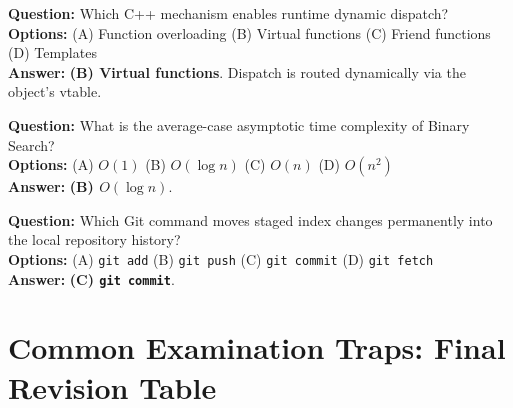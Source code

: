 \begin{tcolorbox}[colback=white,colframe=primary,title=\textbf{Self-Test Question 4}]
\textbf{Question:} Which C++ mechanism enables runtime dynamic dispatch? \\
\textbf{Options:} (A) Function overloading \quad (B) Virtual functions \quad (C) Friend functions \quad (D) Templates \\
\textbf{Answer:} \textbf{(B) Virtual functions}. Dispatch is routed dynamically via the object's vtable.
\end{tcolorbox}

\begin{tcolorbox}[colback=white,colframe=primary,title=\textbf{Self-Test Question 5}]
\textbf{Question:} What is the average-case asymptotic time complexity of Binary Search? \\
\textbf{Options:} (A) $O(1)$ \quad (B) $O(\log n)$ \quad (C) $O(n)$ \quad (D) $O(n^2)$ \\
\textbf{Answer:} \textbf{(B) $O(\log n)$}.
\end{tcolorbox}

\begin{tcolorbox}[colback=white,colframe=primary,title=\textbf{Self-Test Question 6}]
\textbf{Question:} Which Git command moves staged index changes permanently into the local repository history? \\
\textbf{Options:} (A) \texttt{git add} \quad (B) \texttt{git push} \quad (C) \texttt{git commit} \quad (D) \texttt{git fetch} \\
\textbf{Answer:} \textbf{(C) \texttt{git commit}}.
\end{tcolorbox}

\section{Common Examination Traps: Final Revision Table}
\label{sec:exam_traps_revision_table}

